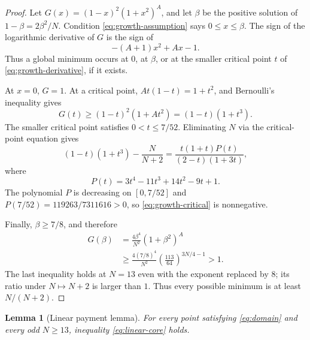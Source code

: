 \documentclass[11pt]{article}
\newtheorem{lemma}[theorem]{Lemma}
\begin{document}
\begin{proof}
Let $G(x)=(1-x)^2(1+x^2)^A$, and let $\beta$ be the positive solution of
$1-\beta=2\beta^2/N$.  Condition \eqref{eq:growth-assumption} says
$0\le x\le\beta$.  The sign of the logarithmic derivative of $G$ is the
sign of
\begin{equation}\label{eq:growth-derivative}
        -(A+1)x^2+Ax-1.
\end{equation}
Thus a global minimum occurs at $0$, at $\beta$, or at the smaller critical
point $t$ of \eqref{eq:growth-derivative}, if it exists.

At $x=0$, $G=1$.  At a critical point,
$At(1-t)=1+t^2$, and Bernoulli's inequality gives
\[
        G(t)\ge(1-t)^2(1+At^2)=(1-t)(1+t^3).
\]
The smaller critical point satisfies $0<t\le7/52$.  Eliminating $N$ via the
critical-point equation gives
\begin{equation}\label{eq:growth-critical}
 (1-t)(1+t^3)-\frac{N}{N+2}
 =\frac{t(1+t)P(t)}{(2-t)(1+3t)},
\end{equation}
where
\[
        P(t)=3t^4-11t^3+14t^2-9t+1.
\]
The polynomial $P$ is decreasing on $[0,7/52]$ and
$P(7/52)=119263/7311616>0$, so \eqref{eq:growth-critical} is nonnegative.

Finally, $\beta\ge7/8$, and therefore
\begin{align*}
 G(\beta)
 &=\frac{4\beta^4}{N^2}(1+\beta^2)^A\\
 &\ge
 \frac{4(7/8)^4}{N^2}
 \left(\frac{113}{64}\right)^{3N/4-1}>1.
\end{align*}
The last inequality holds at $N=13$ even with the exponent replaced by $8$;
its ratio under $N\mapsto N+2$ is larger than $1$.  Thus every possible
minimum is at least $N/(N+2)$.
\end{proof}

\begin{lemma}[Linear payment lemma]\label{lem:linear-payment}
For every point satisfying \eqref{eq:domain} and every odd $N\ge13$,
inequality \eqref{eq:linear-core} holds.
\end{lemma}
\end{document}
